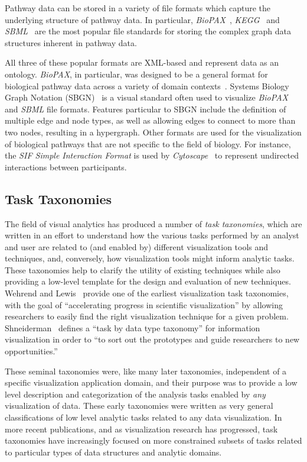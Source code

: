 \documentclass[twocolumn]{bmcart}%
\begin{document}
Pathway data can be stored in a variety of file formats which capture the underlying structure of pathway data.
In particular, \textit{BioPAX}~\cite{demir2010biopax}, \textit{KEGG}~\cite{kanehisa2000kegg} and \textit{SBML}~\cite{Hucka2003} are the most popular file standards for storing the complex graph data structures inherent in pathway data.

All three of these popular formats are XML-based and represent data as an ontology.
\emph{BioPAX}, in particular, was designed to be a general format for biological pathway data across a variety of domain contexts~\cite{demir2010biopax}.
Systems Biology Graph Notation (SBGN)~\cite{Novere2009} is a visual standard often used to visualize \textit{BioPAX} and \textit{SBML} file formats.
Features particular to SBGN include the definition of multiple edge and node types, as well as allowing edges to connect to more than two nodes, resulting in a hypergraph.
Other formats are used for the visualization of biological pathways that are not specific to the field of biology.
For instance, the \textit{SIF Simple Interaction Format} is used by \textit{Cytoscape}~\cite{Shannon2003cytoscape} to represent undirected interactions between participants.

\subsection*{Task Taxonomies}

The field of visual analytics has produced a number of \emph{task taxonomies}, which are written in an effort to understand how the various tasks performed by an analyst and user are related to (and enabled by) different visualization tools and techniques, and, conversely, how visualization tools might inform analytic tasks.
These taxonomies help to clarify the utility of existing techniques while also providing a low-level template for the design and evaluation of new techniques.
Wehrend and Lewis~\cite{Wehrend1990} provide one of the earliest visualization task taxonomies, with the goal of ``accelerating progress in scientific visualization'' by allowing researchers to easily find the right visualization technique for a given problem.
Shneiderman~\cite{Shneiderman1996} defines a ``task by data type taxonomy'' for information visualization in order to ``to sort out the prototypes and guide researchers to new opportunities.''

These seminal taxonomies were, like many later taxonomies, independent of a specific visualization application domain, and their purpose was to provide a low level description and categorization of the analysis tasks enabled by \textit{any} visualization of data.
These early taxonomies were written as very general classifications of low level analytic tasks related to any data visualization.
In more recent publications, and as visualization research has progressed, task taxonomies have increasingly focused on more constrained subsets of tasks related to particular types of data structures and analytic domains.
\end{document}
